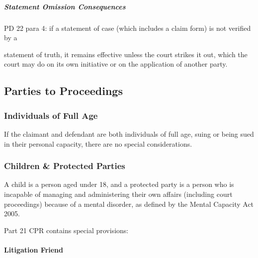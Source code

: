 \documentclass[
]{article}
\begin{document}
\hypertarget{statement-omission-consequences}{%
\subparagraph{Statement Omission
Consequences}\label{statement-omission-consequences}}

PD 22 para 4: if a statement of case (which includes a claim form) is
not verified by a

statement of truth, it remains effective unless the court strikes it
out, which the court may do on its own initiative or on the application
of another party.

\hypertarget{parties-to-proceedings}{%
\subsection{Parties to Proceedings}\label{parties-to-proceedings}}

\hypertarget{individuals-of-full-age}{%
\subsubsection{Individuals of Full Age}\label{individuals-of-full-age}}

If the claimant and defendant are both individuals of full age, suing or
being sued in their personal capacity, there are no special
considerations.

\hypertarget{children-protected-parties}{%
\subsubsection{Children \& Protected
Parties}\label{children-protected-parties}}

A child is a person aged under 18, and a protected party is a person who
is incapable of managing and administering their own affairs (including
court proceedings) because of a mental disorder, as defined by the
Mental Capacity Act 2005.

Part 21 CPR contains special provisions:

\hypertarget{litigation-friend}{%
\paragraph{Litigation Friend}\label{litigation-friend}}
\end{document}
